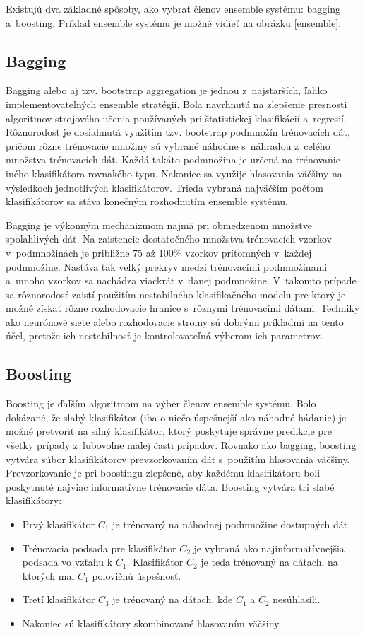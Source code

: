 Existujú dva základné spôsoby, ako vybrať členov ensemble systému: bagging a~boosting. Príklad ensemble systému je možné vidieť na obrázku \ref{ensemble}.

\subsection{Bagging}

Bagging \cite{breiman2} alebo aj tzv. bootstrap aggregation je jednou z~najstarších, ľahko implementovateľných ensemble stratégií. Bola navrhnutá na zlepšenie presnosti algoritmov strojového učenia používaných pri štatistickej klasifikácií a~regresií. Rôznorodosť je dosiahnutá využitím tzv. bootstrap podmnožín trénovacích dát, pričom rôzne trénovacie množiny sú vybrané náhodne s~náhradou z~celého množstva trénovacích dát. Každá takáto podmnožina je určená na trénovanie iného klasifikátora rovnakého typu. Nakoniec sa využije hlasovania väčšiny na výsledkoch jednotlivých klasifikátorov. Trieda vybraná najväčším počtom klasifikátorov sa stáva konečným rozhodnutím ensemble systému.

Bagging je výkonným mechanizmom najmä pri obmedzenom množstve spoľahlivých dát. Na zaisteneie dostatočného množstva trénovacích vzorkov v~podmnožinách je približne 75 až 100\% vzorkov prítomných v~každej podmnožine. Nastáva tak veľký prekryv medzi trénovacími podmnožinami a~mnoho vzorkov sa nachádza viackrát v~danej podmnožine. V~takomto prípade sa rôznorodosť zaistí použitím nestabilného klasifikačného modelu pre ktorý je možné získať rôzne rozhodovacie hranice s~rôznymi trénovacími dátami. Techniky ako neurónové siete alebo rozhodovacie stromy sú dobrými príkladmi na tento účel, pretože ich nestabilnosť je kontrolovateľná výberom ich parametrov.

\subsection{Boosting}

Boosting \cite{boosting} je ďaľším algoritmom na výber členov ensemble systému. Bolo dokázané, že slabý klasifikátor (iba o niečo úspešnejší ako náhodné hádanie) je možné pretvoriť na silný klasifikátor, ktorý poskytuje správne predikcie pre všetky prípady z~ľubovoľne malej časti prípadov. Rovnako ako bagging, boosting vytvára súbor klasifikátorov prevzorkovaním dát s~použitím hlasovania väčšiny. Prevzorkovanie je pri boostingu zlepšené, aby každému klasifikátoru boli poskytnuté najviac informatívne trénovacie dáta. Boosting vytvára tri slabé klasifikátory:
\begin{itemize}
	\item Prvý klasifikátor $C_{1}$ je trénovaný na náhodnej podmnožine dostupných dát.
	\item Trénovacia podsada pre klasifikátor $C_{2}$ je vybraná ako najinformatívnejšia podsada vo vzťahu k $C_{1}$. Klasifikátor $C_{2}$ je teda trénovaný na dátach, na ktorých mal $C_{1}$ polovičnú úspešnosť. 
	\item Tretí klasifikátor $C_{3}$ je trénovaný na dátach, kde $C_{1}$ a $C_{2}$ nesúhlasili.
	\item Nakoniec sú klasifikátory skombinované hlasovaním väčšiny.
\end{itemize}

